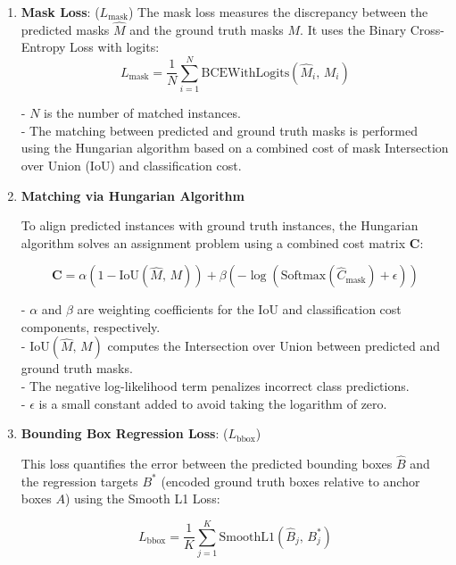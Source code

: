 \vspace{1.5cm}

\begin{enumerate}
    \item \textbf{Mask Loss}: (\( L_{\text{mask}} \))
    The mask loss measures the discrepancy between the predicted masks \( \hat{M} \) and the ground truth masks \( M \). It uses the Binary Cross-Entropy Loss with logits:
    \[
    L_{\text{mask}} = \frac{1}{N} \sum_{i=1}^{N} \text{BCEWithLogits}\left( \hat{M}_i, \, M_i \right)
    \]

    - \( N \) is the number of matched instances. \\
    - The matching between predicted and ground truth masks is performed using the Hungarian algorithm based on a combined cost of mask Intersection over Union (IoU) 
    and classification cost.
    \newpage

    \item \textbf{Matching via Hungarian Algorithm}

    To align predicted instances with ground truth instances, the Hungarian algorithm solves an assignment problem using a combined cost matrix \( \mathbf{C} \):
    
    \[
    \mathbf{C} = \alpha \left( 1 - \text{IoU}\left( \hat{M}, \, M \right) \right) + \beta \left( -\log\left( \text{Softmax}\left( \hat{C}_{\text{mask}} \right) + \epsilon \right) \right)
    \]
    
    - \( \alpha \) and \( \beta \) are weighting coefficients for the IoU and classification cost components, respectively. \\ 
    - \( \text{IoU}\left( \hat{M}, \, M \right) \) computes the Intersection over Union between predicted and ground truth masks. \\
    - The negative log-likelihood term penalizes incorrect class predictions. \\
    - \( \epsilon \) is a small constant added to avoid taking the logarithm of zero. \\

    \item \textbf{Bounding Box Regression Loss}: (\( L_{\text{bbox}} \))

    This loss quantifies the error between the predicted bounding boxes \( \hat{B} \) and the regression targets \( B^* \) (encoded ground truth boxes relative to anchor boxes \( A \)) using the Smooth L1 Loss:
    
    \[
    L_{\text{bbox}} = \frac{1}{K} \sum_{j=1}^{K} \text{SmoothL1}\left( \hat{B}_j, \, B^*_j \right)
    \]
    

\end{enumerate}
